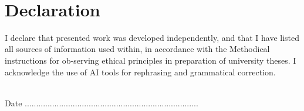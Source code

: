 ~\vfill{}

\section*{Declaration}

I declare that presented work was developed independently, and that I have listed all sources of information used within, in accordance with the Methodical instructions for ob-serving ethical principles in preparation of university theses.
I acknowledge the use of AI tools for rephrasing and grammatical correction.


\vspace{1.5cm}
~\\

Date .............................\hfill{}...............................................

\hfill{}~~~~~~~~~~~~~~~

\newpage{}
